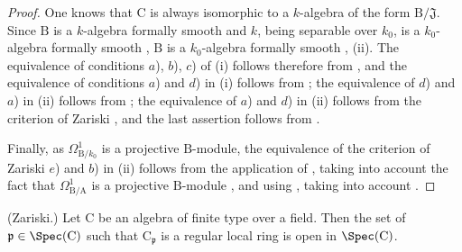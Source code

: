 \begin{proof}
One knows that $\mathrm{C}$ is always isomorphic to a $k$-algebra of the form $\mathrm{B}/\mathfrak{J}$.
Since $\mathrm{B}$ is a $k$-algebra formally smooth  and $k$, being separable over $k_0$, is a $k_0$-algebra formally smooth , $\mathrm{B}$ is a $k_0$-algebra formally smooth , (ii).
The equivalence of conditions $a$), $b$), $c$) of (i) follows therefore from , and the equivalence of conditions $a$) and $d$) in (i) follows from ; the equivalence of $d$) and $a$) in (ii) follows from ; the equivalence of $a$) and $d$) in (ii) follows from the criterion of Zariski , and the last assertion follows from .

Finally, as $\Omega^1_{\mathrm{B}/k_0}$ is a projective $\mathrm{B}$-module, the equivalence of the criterion of Zariski $e$) and $b$) in (ii) follows from the application of , taking into account the fact that $\Omega^1_{\mathrm{B}/\mathrm{A}}$ is a projective $\mathrm{B}$-module , and using , taking into account .
\end{proof}

\begin{corollary}[22.6.8]
\label{0.22.6.8}
\textnormal{(Zariski.)}
Let $\mathrm{C}$ be an algebra of finite type over a field.
Then the set of $\mathfrak{p}\in\Spec(\mathrm{C})$ such that $\mathrm{C}_\mathfrak{p}$ is a regular local ring is open in $\Spec(\mathrm{C})$.
\end{corollary}


